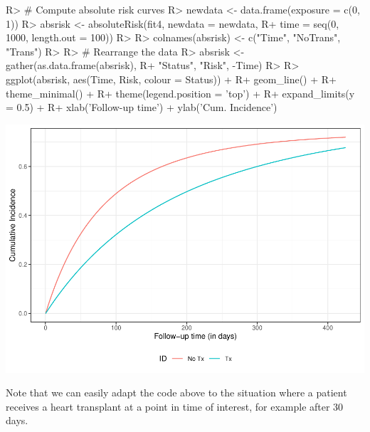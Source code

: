 \documentclass[
]{jss}
\begin{document}
\begin{CodeChunk}

\begin{CodeInput}
R> # Compute absolute risk curves
R> newdata <- data.frame(exposure = c(0, 1))
R> absrisk <- absoluteRisk(fit4, newdata = newdata, 
R+                         time = seq(0, 1000, length.out = 100))
R> 
R> colnames(absrisk) <- c("Time", "NoTrans", "Trans")
R> 
R> # Rearrange the data
R> absrisk <- gather(as.data.frame(absrisk),
R+                   "Status", "Risk", -Time)
R>  
R> ggplot(absrisk, aes(Time, Risk, colour = Status)) +
R+   geom_line() +
R+   theme_minimal() +
R+   theme(legend.position = 'top') +
R+   expand_limits(y = 0.5) +
R+   xlab('Follow-up time') + ylab('Cum. Incidence')
\end{CodeInput}


\begin{center}\includegraphics{../figures/stanford-risk-1} \end{center}

\end{CodeChunk}

Note that we can easily adapt the code above to the situation where a
patient receives a heart transplant at a point in time of interest, for
example after 30 days.
\end{document}
